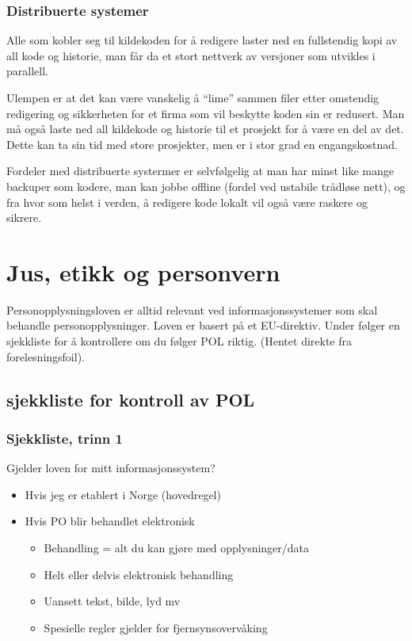 \documentclass[11pt]{article}
\begin{document}
\subsubsection{Distribuerte systemer}
\label{sec-16.2.2}

    Alle som kobler seg til kildekoden for å redigere laster ned en fullstendig kopi
    av all kode og historie, man får da et stort nettverk av versjoner som utvikles i
    parallell.

    Ulempen er at det kan være vanskelig å ``lime'' sammen filer etter omstendig redigering
    og sikkerheten for et firma som vil beskytte koden sin er redusert. Man må også laste
    ned all kildekode og historie til et prosjekt for å være en del av det. Dette kan ta sin
    tid med store prosjekter, men er i stor grad en engangskostnad.

    Fordeler med distribuerte systermer er selvfølgelig at man har minst like mange backuper
    som kodere, man kan jobbe offline (fordel ved ustabile trådløse nett), og fra hvor som helst
    i verden, å redigere kode lokalt vil også være raskere og sikrere.
\section{Jus, etikk og personvern}
\label{sec-17}

  Personopplysningsloven er alltid relevant ved informasjonssystemer som skal behandle personopplysninger. Loven er basert på et EU-direktiv. Under følger en sjekkliste for å kontrollere om du følger POL riktig. (Hentet direkte fra forelesningsfoil).
\subsection{sjekkliste for kontroll av POL}
\label{sec-17.1}
\subsubsection{Sjekkliste, trinn 1}
\label{sec-17.1.1}

    Gjelder loven for mitt informasjonssystem? 
\begin{itemize}
\item Hvis jeg er etablert i Norge (hovedregel)
\item Hvis PO blir behandlet elektronisk

\begin{itemize}
\item Behandling = alt du kan gjøre med opplysninger/data
\item Helt eller delvis elektronisk behandling
\item Uansett tekst, bilde, lyd mv
\item Spesielle regler gjelder for fjernsynsovervåking
\end{itemize}

\end{itemize}
\end{document}
